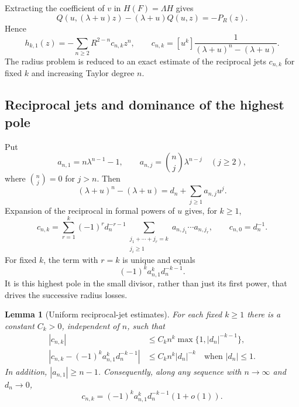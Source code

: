 \documentclass[11pt,a4paper]{article}
\numberwithin{equation}{section}
\newtheorem{lemma}[theorem]{Lemma}
\theoremstyle{definition}
\theoremstyle{remark}
\begin{document}
Extracting the coefficient of $v$ in $H(F)=\Lambda H$ gives
\begin{equation}\label{eq:Qeq}
 Q(u,(\lambda+u)z)-(\lambda+u)Q(u,z)=-P_R(z).
\end{equation}
Hence
\begin{equation}\label{eq:blockformula}
 h_{k,1}(z)=-\sum_{n\ge2}R^{2-n}c_{n,k}z^n,
 \qquad
 c_{n,k}=[u^k]\frac1{(\lambda+u)^n-(\lambda+u)}.
\end{equation}
The radius problem is reduced to an exact estimate of the reciprocal jets
$c_{n,k}$ for fixed $k$ and increasing Taylor degree $n$.

\subsection{Reciprocal jets and dominance of the highest pole}

Put
\[
 a_{n,1}=n\lambda^{n-1}-1,
 \qquad
 a_{n,j}=\binom nj\lambda^{n-j}\quad(j\ge2),
\]
where $\binom nj=0$ for $j>n$. Then
\[
 (\lambda+u)^n-(\lambda+u)
 =d_n+\sum_{j\ge1}a_{n,j}u^j.
\]
Expansion of the reciprocal in formal powers of $u$ gives, for $k\ge1$,
\begin{equation}\label{eq:reciprocaljet}
 c_{n,k}=\sum_{r=1}^k(-1)^r d_n^{-r-1}
     \sum_{\substack{j_1+\cdots+j_r=k\\j_i\ge1}}
           a_{n,j_1}\cdots a_{n,j_r},
 \qquad c_{n,0}=d_n^{-1}.
\end{equation}
For fixed $k$, the term with $r=k$ is unique and equals
\begin{equation}\label{eq:highestpole}
 (-1)^k a_{n,1}^k d_n^{-k-1}.
\end{equation}
It is this highest pole in the small divisor, rather than just its first
power, that drives the successive radius losses.

\begin{lemma}[Uniform reciprocal-jet estimates]\label{lem:jets}
For each fixed $k\ge1$ there is a constant $C_k>0$, independent of $n$,
such that
\begin{align}
 |c_{n,k}|&\le C_k n^k\max\{1,|d_n|^{-k-1}\},\label{eq:jetupper}\\
 \left|c_{n,k}-(-1)^ka_{n,1}^kd_n^{-k-1}\right|
 &\le C_k n^k|d_n|^{-k}
       \quad\text{when }|d_n|\le1.\label{eq:jetremainder}
\end{align}
In addition, $|a_{n,1}|\ge n-1$. Consequently, along any sequence with
$n\to\infty$ and $d_n\to0$,
\begin{equation}\label{eq:jetasymptotic}
 c_{n,k}=(-1)^ka_{n,1}^kd_n^{-k-1}(1+o(1)).
\end{equation}
\end{lemma}
\end{document}
